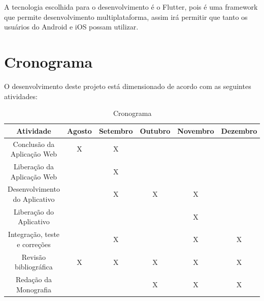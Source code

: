 \documentclass{ifto-tex}
\begin{document}
A tecnologia escolhida para o desenvolvimento é o Flutter, pois é uma framework que permite desenvolvimento multiplataforma, assim irá permitir que tanto os usuários do Android e iOS possam utilizar.

\chapter{Cronograma}
O desenvolvimento deste projeto está dimensionado de acordo com as seguintes atividades:
\begin{table}[h]
	\begin{tabular}{|c|c|c|c|c|c|}
		\hline
		Atividade                             & Agosto & Setembro & Outubro & Novembro & Dezembro \\
		\hline
		Conclusão da Aplicação Web            & X      & X        &         &          &          \\
		\hline
		Liberação da Aplicação Web &        & X        &         &          &          \\
		\hline
		Desenvolvimento do Aplicativo          &        & X        & X       & X        &          \\
		\hline
		Liberação do Aplicativo &        &          &         & X        &          \\
		\hline
		Integração, teste e correções         &        & X        &         & X        & X        \\
		\hline
		Revisão bibliográfica                 & X      & X        & X       & X        & X        \\
		\hline
		Redação da Monografia                 &        &          & X       & X        & X       \\
		\hline
	\end{tabular}
\caption{Cronograma}
\end{table}

\end{document}
